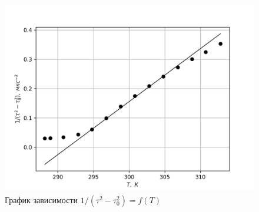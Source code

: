 \documentclass[14pt, a4paper]{report}
\begin{document}
		\begin{figure}[h]
			\centering
			\includegraphics[width=0.75\linewidth]{images/342_2.png}
			\caption{График зависимости $1/(\tau^2-\tau_0^2)=f(T)$}
		\end{figure}
\end{document}
